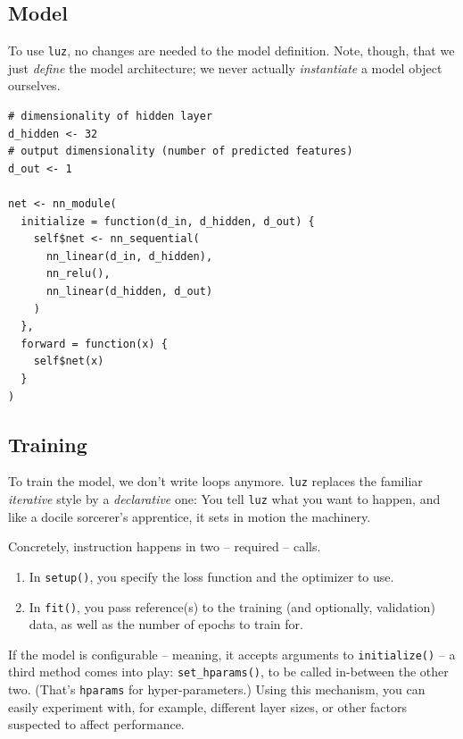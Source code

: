\documentclass[
  letterpaper,
]{krantz}
\providecommand{\tightlist}{%
  \setlength{\itemsep}{0pt}\setlength{\parskip}{0pt}}\usepackage{longtable,booktabs,array}
\begin{document}
\hypertarget{model}{%
\subsection{Model}\label{model}}

To use \texttt{luz}, no changes are needed to the model definition.
Note, though, that we just \emph{define} the model architecture; we
never actually \emph{instantiate} a model object ourselves.

\begin{verbatim}
# dimensionality of hidden layer
d_hidden <- 32
# output dimensionality (number of predicted features)
d_out <- 1

net <- nn_module(
  initialize = function(d_in, d_hidden, d_out) {
    self$net <- nn_sequential(
      nn_linear(d_in, d_hidden),
      nn_relu(),
      nn_linear(d_hidden, d_out)
    )
  },
  forward = function(x) {
    self$net(x)
  }
)
\end{verbatim}

\hypertarget{training-1}{%
\subsection{Training}\label{training-1}}

To train the model, we don't write loops anymore. \texttt{luz} replaces
the familiar \emph{iterative} style by a \emph{declarative} one: You
tell \texttt{luz} what you want to happen, and like a docile sorcerer's
apprentice, it sets in motion the machinery.

Concretely, instruction happens in two -- required -- calls.

\begin{enumerate}
\def\labelenumi{\arabic{enumi}.}
\tightlist
\item
  In \texttt{setup()}, you specify the
  loss function and the optimizer to use.
\item
  In \texttt{fit()}, you pass reference(s)
  to the training (and optionally, validation) data, as well as the
  number of epochs to train for.
\end{enumerate}

If the model is configurable -- meaning, it accepts arguments to
\texttt{initialize()} -- a third method comes into play:
\texttt{set\_hparams()},
to be called in-between the other two. (That's \texttt{hparams} for
hyper-parameters.) Using this mechanism, you can easily experiment with,
for example, different layer sizes, or other factors suspected to affect
performance.
\end{document}
